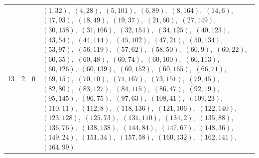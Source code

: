 \documentclass[11pt]{article}
\begin{document}
\begin{longtable}{@{}rrl>{\raggedright\arraybackslash}p{}@{}}
13 & 2 & $0$ & $(1,32)$,\allowbreak\ $(4,28)$,\allowbreak\ $(5,101)$,\allowbreak\ $(6,89)$,\allowbreak\ $(8,164)$,\allowbreak\ $(14,6)$,\allowbreak\ $(17,93)$,\allowbreak\ $(18,49)$,\allowbreak\ $(19,37)$,\allowbreak\ $(21,60)$,\allowbreak\ $(27,149)$,\allowbreak\ $(30,158)$,\allowbreak\ $(31,166)$,\allowbreak\ $(32,154)$,\allowbreak\ $(34,125)$,\allowbreak\ $(40,123)$,\allowbreak\ $(43,54)$,\allowbreak\ $(44,114)$,\allowbreak\ $(45,102)$,\allowbreak\ $(47,21)$,\allowbreak\ $(50,134)$,\allowbreak\ $(53,97)$,\allowbreak\ $(56,119)$,\allowbreak\ $(57,62)$,\allowbreak\ $(58,50)$,\allowbreak\ $(60,9)$,\allowbreak\ $(60,22)$,\allowbreak\ $(60,35)$,\allowbreak\ $(60,48)$,\allowbreak\ $(60,74)$,\allowbreak\ $(60,100)$,\allowbreak\ $(60,113)$,\allowbreak\ $(60,126)$,\allowbreak\ $(60,139)$,\allowbreak\ $(60,152)$,\allowbreak\ $(60,165)$,\allowbreak\ $(66,71)$,\allowbreak\ $(69,15)$,\allowbreak\ $(70,10)$,\allowbreak\ $(71,167)$,\allowbreak\ $(73,151)$,\allowbreak\ $(79,45)$,\allowbreak\ $(82,80)$,\allowbreak\ $(83,127)$,\allowbreak\ $(84,115)$,\allowbreak\ $(86,47)$,\allowbreak\ $(92,19)$,\allowbreak\ $(95,145)$,\allowbreak\ $(96,75)$,\allowbreak\ $(97,63)$,\allowbreak\ $(108,41)$,\allowbreak\ $(109,23)$,\allowbreak\ $(110,11)$,\allowbreak\ $(112,8)$,\allowbreak\ $(118,136)$,\allowbreak\ $(121,106)$,\allowbreak\ $(122,140)$,\allowbreak\ $(123,128)$,\allowbreak\ $(125,73)$,\allowbreak\ $(131,110)$,\allowbreak\ $(134,2)$,\allowbreak\ $(135,88)$,\allowbreak\ $(136,76)$,\allowbreak\ $(138,138)$,\allowbreak\ $(144,84)$,\allowbreak\ $(147,67)$,\allowbreak\ $(148,36)$,\allowbreak\ $(149,24)$,\allowbreak\ $(151,34)$,\allowbreak\ $(157,58)$,\allowbreak\ $(160,132)$,\allowbreak\ $(162,141)$,\allowbreak\ $(164,99)$\\

\end{longtable}
\end{document}
